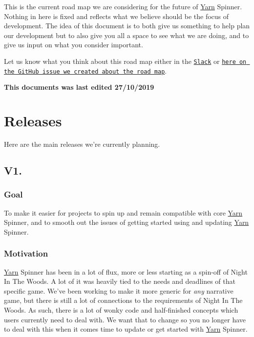 This is the current road map we are considering for the future of \hyperlink{a00050}{Yarn} Spinner. Nothing in here is fixed and reflects what we believe should be the focus of development. The idea of this document is to both give us something to help plan our development but to also give you all a space to see what we are doing, and to give us input on what you consider important.

Let us know what you think about this road map either in the \href{http://lab.to/narrativegamedev}{\tt Slack} or \href{https://github.com/YarnSpinnerTool/YarnSpinner/issues/183}{\tt here on the Git\-Hub issue we created about the road map}.

{\bfseries This documents was last edited 27/10/2019}

\section*{Releases}

Here are the main releases we're currently planning.

\subsection*{V1.}

\subsubsection*{Goal}

To make it easier for projects to spin up and remain compatible with core \hyperlink{a00050}{Yarn} Spinner, and to smooth out the issues of getting started using and updating \hyperlink{a00050}{Yarn} Spinner.

\subsubsection*{Motivation}

\hyperlink{a00050}{Yarn} Spinner has been in a lot of flux, more or less starting as a spin-\/off of Night In The Woods. A lot of it was heavily tied to the needs and deadlines of that specific game. We've been working to make it more generic for {\itshape any} narrative game, but there is still a lot of connections to the requirements of Night In The Woods. As such, there is a lot of wonky code and half-\/finished concepts which users currently need to deal with. We want that to change so you no longer have to deal with this when it comes time to update or get started with \hyperlink{a00050}{Yarn} Spinner.

